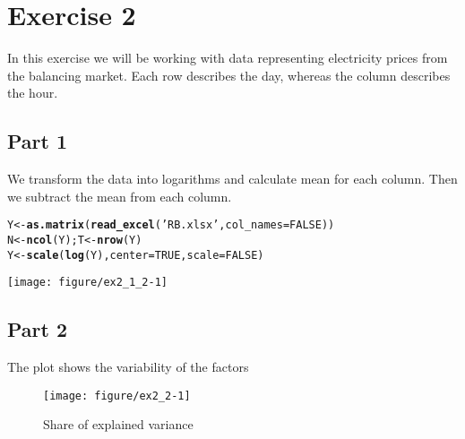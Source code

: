 \documentclass[12pt, a4paper]{article}\usepackage[]{graphicx}\usepackage[]{color}
\makeatletter
\def\maxwidth{ %
  \ifdim\Gin@nat@width>\linewidth
    \linewidth
  \else
    \Gin@nat@width
  \fi
}
\newcommand{\hlnum}[1]{\textcolor[rgb]{0.686,0.059,0.569}{#1}}%
\newcommand{\hlstr}[1]{\textcolor[rgb]{0.192,0.494,0.8}{#1}}%
\newcommand{\hlstd}[1]{\textcolor[rgb]{0.345,0.345,0.345}{#1}}%
\newcommand{\hlkwb}[1]{\textcolor[rgb]{0.69,0.353,0.396}{#1}}%
\newcommand{\hlkwc}[1]{\textcolor[rgb]{0.333,0.667,0.333}{#1}}%
\newcommand{\hlkwd}[1]{\textcolor[rgb]{0.737,0.353,0.396}{\textbf{#1}}}%
\newenvironment{kframe}{%
 \def\at@end@of@kframe{}%
 \ifinner\ifhmode%
  \def\at@end@of@kframe{\end{minipage}}%
  \begin{minipage}{\columnwidth}%
 \fi\fi%
 \def\FrameCommand##1{\hskip\@totalleftmargin \hskip-\fboxsep
 \colorbox{shadecolor}{##1}\hskip-\fboxsep
     \hskip-\linewidth \hskip-\@totalleftmargin \hskip\columnwidth}%
 \MakeFramed {\advance\hsize-\width
   \@totalleftmargin\z@ \linewidth\hsize
   \@setminipage}}%
 {\par\unskip\endMakeFramed%
 \at@end@of@kframe}
\newenvironment{knitrout}{}{} %
\makeatother
\begin{document}

\section{Exercise 2}

In this exercise we will be working with data representing electricity prices from the balancing market. Each row describes the day, whereas the column describes the hour.

\subsection{Part 1}
We transform the data into logarithms and calculate mean for each column. Then we subtract the mean from each column.

\begin{knitrout}
\color{fgcolor}\begin{kframe}
\begin{alltt}
\hlstd{Y} \hlkwb{<-} \hlkwd{as.matrix}\hlstd{(}\hlkwd{read_excel}\hlstd{(}\hlstr{'RB.xlsx'}\hlstd{,} \hlkwc{col_names} \hlstd{=} \hlnum{FALSE}\hlstd{))}
\hlstd{N} \hlkwb{<-} \hlkwd{ncol}\hlstd{(Y); T} \hlkwb{<-} \hlkwd{nrow}\hlstd{(Y)}
\hlstd{Y} \hlkwb{<-} \hlkwd{scale}\hlstd{(}\hlkwd{log}\hlstd{(Y),} \hlkwc{center} \hlstd{=} \hlnum{TRUE}\hlstd{,} \hlkwc{scale} \hlstd{=} \hlnum{FALSE}\hlstd{)}
\end{alltt}
\end{kframe}
\end{knitrout}

\begin{knitrout}
\color{fgcolor}

{\centering \texttt{[image: figure/ex2\_1\_2-1]} 

}



\end{knitrout}




\subsection{Part 2}
The plot shows the variability of the factors
\begin{knitrout}
\color{fgcolor}\begin{figure}[H]

{\centering \texttt{[image: figure/ex2\_2-1]} 

}

\caption[Share of explained variance]{Share of explained variance}\label{fig:ex2.2}
\end{figure}


\end{knitrout}
\end{document}
